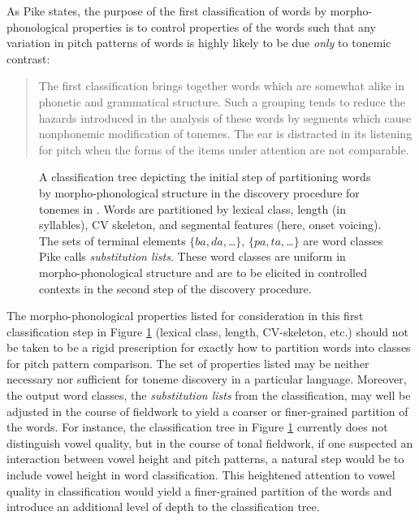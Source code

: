 \documentclass[12pt]{article}
\begin{document}
As Pike states, the purpose of the first classification of words by
morpho-phonological properties is to control properties of the words
such that any variation in pitch patterns of words is highly likely to
be due \textit{only} to tonemic contrast: 

\begin{quote}
  \textsf{\small{The first classification brings together words which
      are somewhat alike in phonetic and grammatical structure. Such a
    grouping tends to reduce the hazards introduced in the analysis of
  these words by segments which cause nonphonemic modification of
  tonemes. The ear is distracted in its listening for pitch when the
  forms of the items under attention are not comparable. \citep[p.\ 48]{Pike:1948}}}
\end{quote}


\begin{figure}
  \centering
  \caption{A classification tree depicting the initial step of partitioning
    words by morpho-phonological structure in the discovery procedure for tonemes
    in \citet[Ch.\ 4]{Pike:1948}. Words are partitioned by lexical
    class, length (in syllables), CV skeleton, and segmental
    features (here, onset voicing). The sets of terminal elements
    $\{ba, da,$\ldots$\}$, $\{pa, ta,$\ldots$\}$ are word classes Pike calls
    \textit{substitution lists}. These word classes are uniform in morpho-phonological
    structure and are to be elicited in controlled contexts in the second step
    of the discovery procedure.}
  \label{fig:words-tikz}
\end{figure}

The morpho-phonological properties listed for consideration in this
first classification step in Figure \ref{fig:words-tikz} (lexical class, length,
CV-skeleton, etc.) should not be taken to be a rigid prescription for
exactly how to partition words into classes for pitch pattern
comparison. The set of properties listed may
be neither necessary nor sufficient for toneme discovery in a
particular language. Moreover, the output word classes, the
\textit{substitution lists} from the
classification, may well be adjusted in the course of fieldwork to yield
a coarser or finer-grained partition of the words. For instance, the
classification tree in Figure \ref{fig:words-tikz} currently does not
distinguish vowel quality, but in the course of tonal fieldwork, if one
suspected an interaction between vowel height and pitch patterns,
a natural step would be to include vowel height in word
classification. This heightened attention to vowel quality in classification would yield a
finer-grained partition of the words and introduce an additional level
of depth to the classification tree.    
\end{document}
